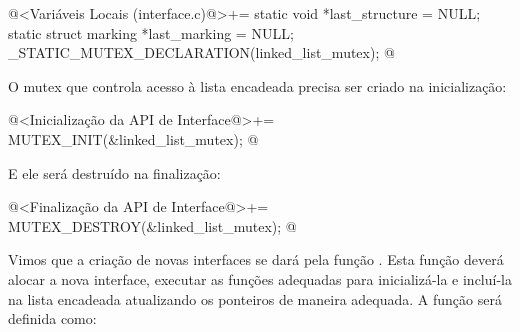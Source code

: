 \iniciocodigo
@<Variáveis Locais (interface.c)@>+=
static void *last_structure = NULL;
static struct marking *last_marking = NULL;
_STATIC_MUTEX_DECLARATION(linked_list_mutex);
@
\fimcodigo

O mutex que controla acesso à lista encadeada precisa ser criado na
inicialização:

\iniciocodigo
@<Inicialização da API de Interface@>+=
MUTEX_INIT(&linked_list_mutex);
@
\fimcodigo

E ele será destruído na finalização:

\iniciocodigo
@<Finalização da API de Interface@>+=
MUTEX_DESTROY(&linked_list_mutex);
@
\fimcodigo


Vimos que a criação de novas interfaces se dará pela função
. Esta função deverá alocar a nova
interface, executar as funções adequadas para inicializá-la e
incluí-la na lista encadeada atualizando os ponteiros de maneira
adequada. A função será definida como:

